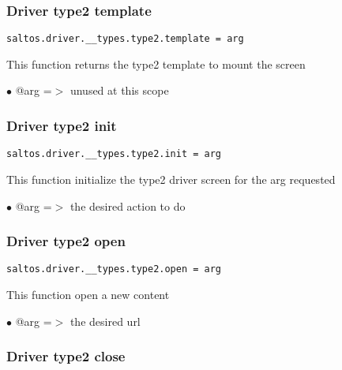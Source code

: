 \documentclass[a4paper]{article}
\begin{document}
\hypertarget{toc745}{}
\subsubsection{Driver type2 template}

\begin{lstlisting}
saltos.driver.__types.type2.template = arg
\end{lstlisting}

This function returns the type2 template to mount the screen

\begin{compactitem}
\item[\color{myblue}$\bullet$] @arg =$>$ unused at this scope
\end{compactitem}

\hypertarget{toc746}{}
\subsubsection{Driver type2 init}

\begin{lstlisting}
saltos.driver.__types.type2.init = arg
\end{lstlisting}

This function initialize the type2 driver screen for the arg requested

\begin{compactitem}
\item[\color{myblue}$\bullet$] @arg =$>$ the desired action to do
\end{compactitem}

\hypertarget{toc747}{}
\subsubsection{Driver type2 open}

\begin{lstlisting}
saltos.driver.__types.type2.open = arg
\end{lstlisting}

This function open a new content

\begin{compactitem}
\item[\color{myblue}$\bullet$] @arg =$>$ the desired url
\end{compactitem}

\hypertarget{toc748}{}
\subsubsection{Driver type2 close}
\end{document}
